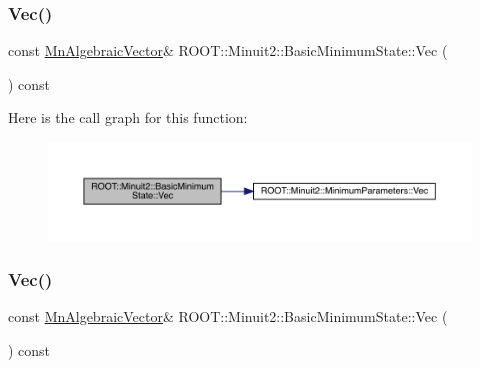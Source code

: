 \subsubsection{\texorpdfstring{Vec()}{Vec()}\hspace{0.1cm}{\footnotesize\ttfamily [1/3]}}
{\footnotesize\ttfamily const \mbox{\hyperlink{namespaceROOT_1_1Minuit2_a62ed97730a1ca8d3fbaec64a19aa11c9}{Mn\+Algebraic\+Vector}}\& R\+O\+O\+T\+::\+Minuit2\+::\+Basic\+Minimum\+State\+::\+Vec (\begin{DoxyParamCaption}{ }\end{DoxyParamCaption}) const\hspace{0.3cm}{\ttfamily [inline]}}

Here is the call graph for this function\+:
\nopagebreak
\begin{figure}[H]
\begin{center}
\leavevmode
\includegraphics[width=350pt]{d0/db1/classROOT_1_1Minuit2_1_1BasicMinimumState_a43ea742b5bd55d2c4e9d6b75308fb875_cgraph}
\end{center}
\end{figure}
\mbox{\label{classROOT_1_1Minuit2_1_1BasicMinimumState_a43ea742b5bd55d2c4e9d6b75308fb875}} 
\subsubsection{\texorpdfstring{Vec()}{Vec()}\hspace{0.1cm}{\footnotesize\ttfamily [2/3]}}
{\footnotesize\ttfamily const \mbox{\hyperlink{namespaceROOT_1_1Minuit2_a62ed97730a1ca8d3fbaec64a19aa11c9}{Mn\+Algebraic\+Vector}}\& R\+O\+O\+T\+::\+Minuit2\+::\+Basic\+Minimum\+State\+::\+Vec (\begin{DoxyParamCaption}{ }\end{DoxyParamCaption}) const\hspace{0.3cm}{\ttfamily [inline]}}

